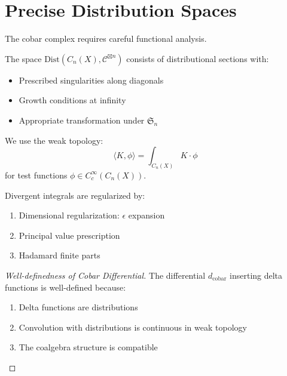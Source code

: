 \section{Precise Distribution Spaces}

The cobar complex requires careful functional analysis.

\begin{definition}
The space $\text{Dist}(C_n(X), \mathcal{C}^{\boxtimes n})$ consists of distributional sections with:
\begin{itemize}
\item Prescribed singularities along diagonals
\item Growth conditions at infinity
\item Appropriate transformation under $\mathfrak{S}_n$
\end{itemize}
\end{definition}

\begin{theorem}[Topology]
We use the weak topology:
$$\langle K, \phi \rangle = \int_{C_n(X)} K \cdot \phi$$
for test functions $\phi \in C_c^\infty(C_n(X))$.
\end{theorem}

\begin{lemma}[Regularization]
Divergent integrals are regularized by:
\begin{enumerate}
\item Dimensional regularization: $\epsilon$ expansion
\item Principal value prescription
\item Hadamard finite parts
\end{enumerate}
\end{lemma}

\begin{proof}[Well-definedness of Cobar Differential]
The differential $d_{\text{cobar}}$ inserting delta functions is well-defined because:
\begin{enumerate}
\item Delta functions are distributions
\item Convolution with distributions is continuous in weak topology
\item The coalgebra structure is compatible
\end{enumerate}
\end{proof}

